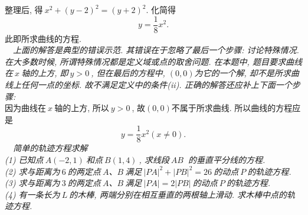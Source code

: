     整理后, 得$\ x^2+(y-2)^2=(y+2)^2$. 化简得$$y=\frac{1}{8}x^2.$$
    此即所求曲线的方程.\\
     \ \ {\it 上面的解答是典型的错误示范. 其错误在于忽略了最后一个步骤: 讨论特殊情况. 在大多数时候, 所谓特殊情况都是定义域或点的取舍问题. 在本题中, 题目要求曲线在$\ x\ $轴的上方, 即$\ y>0\ $, 但在最后的方程中, $(0,0)$为它的一个解, 却不是所求曲线上任何一点的坐标. 故不满足定义中的条件(ii). 正确的解答还应补上下面一个步骤: \\}
     \indent 因为曲线在$\ x\ $轴的上方, 所以$\ y>0\ $, 故$(0,0)$不属于所求曲线. 所以曲线的方程应是$$y=\frac{1}{8}x^2(x\not=0).$$
     {\it {}\ \ 简单的轨迹方程求解\\
    \indent \indent (1) 已知点$\ A(-2,1)\ $和点$\ B(1,4)\ $, 求线段$\ AB\ $ 的垂直平分线的方程.\\
    \indent \indent (2) 求与距离为$\ 6\ $的两定点$\ A$、$B\ $满足$\ |PA|^2+|PB|^2=26\ $的动点$\ P\ $的轨迹方程.\\
    \indent \indent (3) 求与距离为$\ 3\ $的两定点$\ A$、$B\ $满足$\ |PA|=2|PB|\ $的动点$\ P\ $的轨迹方程. \\
    \indent \indent (4) 有一条长为$\ L\ $的木棒, 两端分别在相互垂直的两根轴上滑动. 求木棒中点的轨迹方程. }
